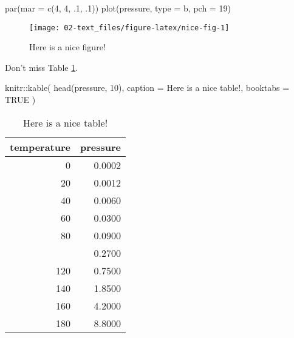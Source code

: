 \documentclass[
]{book}
\newenvironment{Shaded}{\begin{snugshade}}{\end{snugshade}}
\newcommand{\AttributeTok}[1]{\textcolor[rgb]{0.77,0.63,0.00}{#1}}
\newcommand{\ConstantTok}[1]{\textcolor[rgb]{0.00,0.00,0.00}{#1}}
\newcommand{\DecValTok}[1]{\textcolor[rgb]{0.00,0.00,0.81}{#1}}
\newcommand{\FunctionTok}[1]{\textcolor[rgb]{0.00,0.00,0.00}{#1}}
\newcommand{\NormalTok}[1]{#1}
\newcommand{\SpecialCharTok}[1]{\textcolor[rgb]{0.00,0.00,0.00}{#1}}
\newcommand{\StringTok}[1]{\textcolor[rgb]{0.31,0.60,0.02}{#1}}
\begin{document}
\begin{Shaded}
\begin{Highlighting}[]
\FunctionTok{par}\NormalTok{(}\AttributeTok{mar =} \FunctionTok{c}\NormalTok{(}\DecValTok{4}\NormalTok{, }\DecValTok{4}\NormalTok{, .}\DecValTok{1}\NormalTok{, .}\DecValTok{1}\NormalTok{))}
\FunctionTok{plot}\NormalTok{(pressure, }\AttributeTok{type =} \StringTok{\textquotesingle{}b\textquotesingle{}}\NormalTok{, }\AttributeTok{pch =} \DecValTok{19}\NormalTok{)}
\end{Highlighting}
\end{Shaded}

\begin{figure}

{\centering \texttt{[image: 02-text\_files/figure-latex/nice-fig-1]} 

}

\caption{Here is a nice figure!}\label{fig:nice-fig}
\end{figure}

Don't miss Table \ref{tab:nice-tab}.

\begin{Shaded}
\begin{Highlighting}[]
\NormalTok{knitr}\SpecialCharTok{::}\FunctionTok{kable}\NormalTok{(}
  \FunctionTok{head}\NormalTok{(pressure, }\DecValTok{10}\NormalTok{), }\AttributeTok{caption =} \StringTok{\textquotesingle{}Here is a nice table!\textquotesingle{}}\NormalTok{,}
  \AttributeTok{booktabs =} \ConstantTok{TRUE}
\NormalTok{)}
\end{Highlighting}
\end{Shaded}

\begin{table}

\caption{\label{tab:nice-tab}Here is a nice table!}
\centering
\begin{tabular}[t]{rr}
\toprule
temperature & pressure\\
\midrule
0 & 0.0002\\
20 & 0.0012\\
40 & 0.0060\\
60 & 0.0300\\
80 & 0.0900\\
\addlinespace
100 & 0.2700\\
120 & 0.7500\\
140 & 1.8500\\
160 & 4.2000\\
180 & 8.8000\\
\bottomrule
\end{tabular}
\end{table}
\end{document}

